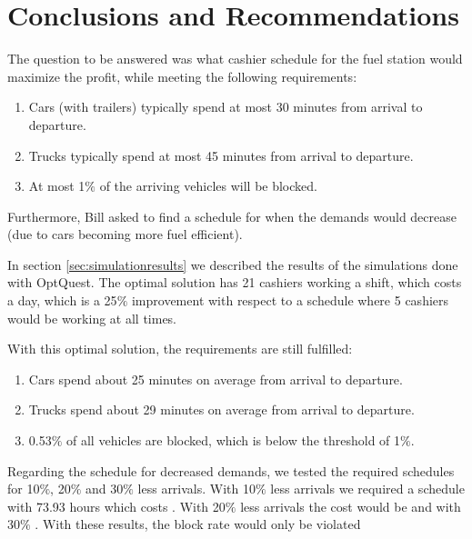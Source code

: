 \section{Conclusions and Recommendations}
The question to be answered was what cashier schedule for the fuel station would maximize the profit, while meeting the following requirements:
\begin{enumerate}
	\item Cars (with  trailers) typically spend at most 30 minutes from arrival to departure.
	\item Trucks typically spend at most 45 minutes from arrival to departure.
	\item At most 1$\%$ of the arriving vehicles will be blocked.
\end{enumerate}
Furthermore, Bill asked to find a schedule for when the demands would decrease (due to cars becoming more fuel efficient).

In section \ref{sec:simulationresults} we described the results of the simulations done with OptQuest. The optimal solution has 21 cashiers working a shift, which costs  a day, which is a 25$\%$ improvement with respect to a schedule where 5 cashiers would be working at all times.

With this optimal solution, the requirements are still fulfilled:
\begin{enumerate}
	\item Cars spend about 25 minutes on average from arrival to departure.
	\item Trucks spend about 29 minutes on average from arrival to departure.
	\item 0.53$\%$ of all vehicles are blocked, which is below the threshold of 1$\%$.
\end{enumerate}

Regarding the schedule for decreased demands, we tested the required schedules for 10$\%$, 20$\%$ and 30$\%$ less arrivals. With 10$\%$ less arrivals we required a schedule with 73.93 hours which costs . With 20$\%$ less arrivals the cost would be  and with 30$\%$ . With these results, the block rate would only be violated 